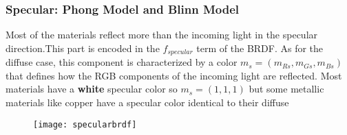 \subsubsection{Specular: Phong Model and Blinn Model} 
Most of the materials reflect more than the incoming light in the specular direction.This part is encoded in the $f_{specular}$ term of the BRDF. As for the diffuse case, this component is characterized by a color $m_s=(m_{Rs},m_{Gs},m_{Bs})$ that defines how the RGB components of the incoming light are reflected.
Most materials have a \textbf{white} specular color so $m_s=(1,1,1)$ but some metallic materials like copper have a specular color identical to their diffuse
\begin{figure}[H]
  \centering
  \texttt{[image: specularbrdf]}
\end{figure}
